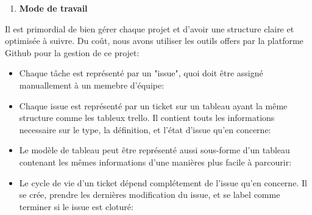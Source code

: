 \begin{enumerate}
\def\labelenumi{\arabic{enumi}.}
\item
  \textbf{Mode de travail}
\end{enumerate}

Il est primordial de bien gérer chaque projet et d'avoir une structure
claire et optimisée à suivre. Du coût, nous avons utiliser les outils
offers par la platforme Github pour la gestion de ce projet:

\begin{itemize}
\item
  Chaque tâche est représenté par un "issue", quoi doit être assigné
  manuallement à un memebre d'équipe:\\
  \begin{figure}[H]
    \begin{center}
        \caption{}
    \end{center}
\end{figure}
\item
  Chaque issue est représenté par un ticket sur un tableau ayant la même
  structure comme les tableux trello. Il contient touts les informations
  necessaire sur le type, la définition, et l'état d'issue qu'en
  concerne:\\
  \begin{figure}[H]
    \begin{center}
        \caption{}
    \end{center}
\end{figure}
\item
  Le modèle de tableau peut être représenté aussi sous-forme d'un tableau
  contenant les mêmes informations d'une manières plus facile à
  parcourir:\\
  \begin{figure}[H]
    \begin{center}
        \caption{}
    \end{center}
\end{figure}
\item
  Le cycle de vie d'un ticket dépend complétement de l'issue qu'en
  concerne. Il se crée, prendre les dernières modification du issue, et
  se label comme terminer si le issue est cloturé:\\
  \begin{figure}[H]
    \begin{center}
        \caption{}
    \end{center}
\end{figure}
\end{itemize}

